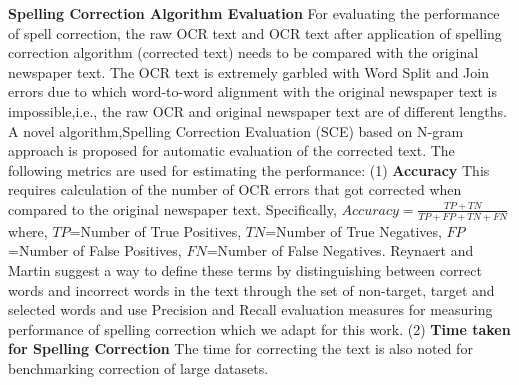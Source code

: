 \documentclass[preprint,11pt]{elsarticle}
\begin{document}
\noindent \textbf{Spelling Correction Algorithm Evaluation }
\label{spell:sce}
For evaluating the performance of spell correction, the raw OCR text and OCR text after application of spelling correction algorithm (corrected text) needs to be compared with the original newspaper text. The OCR text is extremely garbled with Word Split and Join errors due to which word-to-word alignment with the original newspaper text is impossible,i.e., the raw OCR and original newspaper text are of different lengths. A novel algorithm,Spelling Correction Evaluation (SCE) based on N-gram approach is proposed for automatic evaluation of the corrected text. %
The  following metrics are used for estimating the performance:
(1) \textbf{Accuracy }This requires calculation of the number of OCR errors that got corrected when compared to the original newspaper text. Specifically,
$Accuracy=  \frac{TP+TN} {TP+ FP + TN + FN}$ where, $TP$=Number of True Positives, $TN$=Number of True Negatives, $FP$=Number of False Positives, $FN$=Number of False Negatives. %
Reynaert and Martin\cite{reynaert2008all} suggest a way to define these terms by distinguishing between correct words and incorrect words in the text through the set of non-target, target and selected words and use Precision and Recall evaluation measures for measuring performance of spelling correction which we adapt for this work. %
(2) \textbf{Time taken for Spelling Correction } The time for correcting the text is also noted for benchmarking correction of large datasets.
\end{document}
